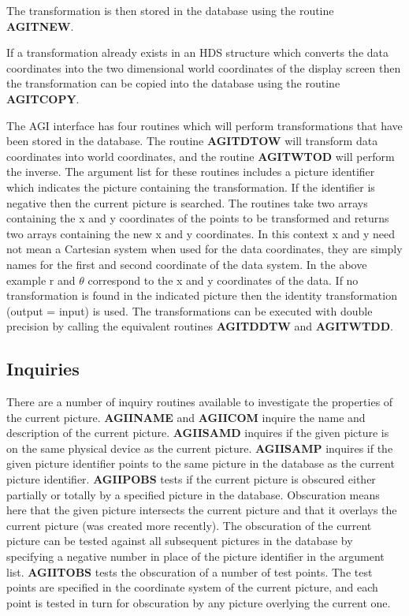 \documentclass[twoside,11pt]{article}
\newcommand{\htmlref}[2]{#1}
\renewcommand{\_}{\texttt{\symbol{95}}}
\begin{document}
The transformation is then stored in the database using the routine
\htmlref{{\bf AGI\_TNEW}}{AGI_TNEW}.

If a transformation already exists in an HDS structure which converts
the data coordinates into the two dimensional world coordinates of the
display screen then the transformation can be copied into the database
using the routine \htmlref{{\bf AGI\_TCOPY}}{AGI_TCOPY}.

The AGI interface has four routines which will perform transformations
that have been stored in the database. The routine 
\htmlref{{\bf AGI\_TDTOW}}{AGI_TDTOW}
will transform data coordinates into world coordinates, and the routine
\htmlref{{\bf AGI\_TWTOD}}{AGI_TWTOD} will perform the inverse.
The argument list for these routines includes a picture identifier which
indicates the picture containing the transformation. If the identifier is
negative then the current picture is searched.
The routines take two arrays containing the x and y coordinates of the
points to be transformed and returns two arrays containing the new
x and y coordinates. In this context x and y need not mean a
Cartesian system when used for the data coordinates, they are simply
names for the first and second coordinate of the data system. In the above
example r and $\theta$ correspond to the x and y coordinates of the
data. If no transformation is found in the indicated picture then the
identity transformation (output = input) is used. The transformations
can be executed with double precision by calling the equivalent routines
\htmlref{{\bf AGI\_TDDTW}}{AGI_TDDTW} and \htmlref{{\bf AGI\_TWTDD}}{AGI_TWTDD}.

\subsection{Inquiries}
There are a number of inquiry routines available to investigate the properties
of the current picture.
\htmlref{{\bf AGI\_INAME}}{AGI_INAME} and 
\htmlref{{\bf AGI\_ICOM}}{AGI_ICOM} inquire the name and description of the
current picture.
\htmlref{{\bf AGI\_ISAMD}}{AGI_ISAMD} inquires if the given picture is on 
the same physical device as the current picture.
\htmlref{{\bf AGI\_ISAMP}}{AGI_ISAMP} inquires if the given picture identifier 
points to the same picture in the database as the current picture identifier.
\htmlref{{\bf AGI\_IPOBS}}{AGI_IPOBS} tests if the current picture is 
obscured either partially or totally by a specified picture in the database.
Obscuration means here that the given picture intersects the current picture
and that it overlays the current picture (was created more recently).
The obscuration of the current picture can be tested against all subsequent
pictures in the database by specifying a negative number in place of the
picture identifier in the argument list.
\htmlref{{\bf AGI\_ITOBS}}{AGI_ITOBS} tests the obscuration of a number 
of test points.
The test points are specified in the coordinate system of the current picture,
and each point is tested in turn for obscuration by any picture overlying the
current one.
\end{document}

